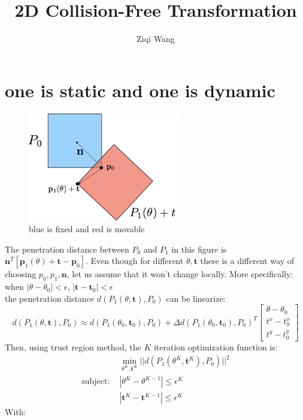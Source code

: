 \documentclass[12pt]{amsart}
\title{2D Collision-Free Transformation}
\author{Ziqi Wang}
\date{} %
\newcommand{\bt}{\mathbf{t}}
\newcommand{\bn}{\mathbf{n}}
\begin{document}
\maketitle

\section{one is static and one is dynamic}
\begin{figure}[!htbp]
  \centering
    \includegraphics[width=0.6\textwidth]{1fixed1move.png}
      \caption{blue is fixed and red is movable}
\end{figure}
The penetration distance between $P_0$ and $P_1$ in this figure is $\bn^T[\mathbf{p}_1(\theta) + \bt - \mathbf{p}_0]$. Even though for different $\theta, \bt$ there is a different way of choosing $p_0, p_1, \bn$, let us assume that it won't change locally. More specifically:\\
when $|\theta - \theta_0|<\epsilon$, $|\bt - \bt_0|<\epsilon$\\
the penetration distance $d(P_1(\theta, \bt),P_0)$ can be linearize: 
\begin{equation}
	d(P_1(\theta, \bt),P_0) \approx d(P_1(\theta_0, \bt_0),P_0) + \Delta d(P_1(\theta_0, \bt_0),P_0)^T \begin{bmatrix}
		\theta - \theta_0\\
		t^x - t^x_0 \\
		t^y - t^y_0
		\end{bmatrix}
	\end{equation}
Then, using trust region method, the $K$ iteration optimization function is:
\begin{align}
	&\min_{\theta^K, \bt^K} ||d(P_1(\theta^K, \bt^K),P_0)||^2 \\
	\text{subject: } & |\theta^K - \theta^{K-1}| \leq \epsilon^K \\
			       & |\bt^K - \bt^{K-1}| \leq \epsilon^K
\end{align}
With:
\end{document}
